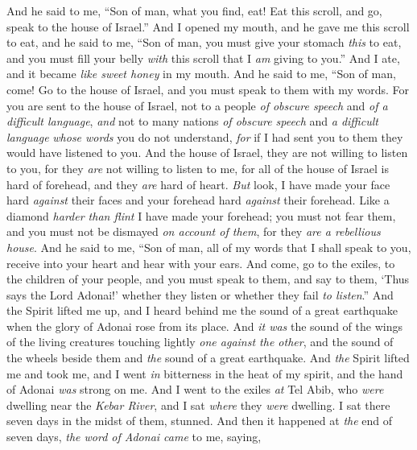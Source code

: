\begin{biblechapter} %
\verse And he said to me, “Son of man, what you find, eat! Eat this scroll, and go, speak to the house of Israel.”
\verse And I opened my mouth, and he gave me this scroll to eat,
\verse and he said to me, “Son of man, you must give your stomach \textit{this} to eat, and you must fill your belly \textit{with} this scroll that I \textit{am} giving to you.” And I ate, and it became \textit{like sweet honey} in my mouth.
\verse And he said to me, “Son of man, come! Go to the house of Israel, and you must speak to them with my words.
\verse For you are sent to the house of Israel, not to a people \textit{of obscure speech} and \textit{of a difficult language},
\verse \textit{and} not to many nations \textit{of obscure speech} and \textit{a difficult language} \textit{whose words} you do not understand, \textit{for} if I had sent you to them they would have listened to you.
\verse And the house of Israel, they are not willing to listen to you, for they \textit{are} not willing to listen to me, for all of the house of Israel is hard of forehead, and they \textit{are} hard of heart.
\verse \textit{But} look, I have made your face hard \textit{against} their faces and your forehead hard \textit{against} their forehead.
\verse Like a diamond \textit{harder than flint} I have made your forehead; you must not fear them, and you must not be dismayed \textit{on account of them}, for they \textit{are a rebellious house}.
\verse And he said to me, “Son of man, all of my words that I shall speak to you, receive into your heart and hear with your ears.
\verse And come, go to the exiles, to the children of your people, and you must speak to them, and say to them, ‘Thus says the Lord Adonai!’ whether they listen or whether they fail \textit{to listen}.”
\verse And the Spirit lifted me up, and I heard behind me the sound of a great earthquake when the glory of Adonai rose from its place.
\verse And \textit{it was} the sound of the wings of the living creatures touching lightly \textit{one against the other}, and the sound of the wheels beside them and \textit{the} sound of a great earthquake.
\verse And \textit{the} Spirit lifted me and took me, and I went \textit{in} bitterness in the heat of my spirit, and the hand of Adonai \textit{was} strong on me.
\verse And I went to the exiles \textit{at} Tel Abib, who \textit{were} dwelling near the \textit{Kebar River}, and I sat \textit{where} they \textit{were} dwelling. I sat there seven days in the midst of them, stunned.
\verse And then it happened at \textit{the} end of seven days, \textit{the word of Adonai came} to me, saying,

\end{biblechapter}
